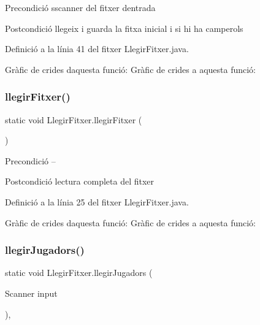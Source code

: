 \begin{DoxyPrecond}{Precondició}
sscanner del fitxer d\textquotesingle{}entrada 
\end{DoxyPrecond}
\begin{DoxyPostcond}{Postcondició}
llegeix i guarda la fitxa inicial i si hi ha camperols 
\end{DoxyPostcond}


Definició a la línia 41 del fitxer Llegir\+Fitxer.\+java.

Gràfic de crides d\textquotesingle{}aquesta funció\+:
Gràfic de crides a aquesta funció\+:
\mbox{\label{class_llegir_fitxer_a821a8ff7021fb5faac6ff4297bb00b61}} 
\subsubsection{\texorpdfstring{llegir\+Fitxer()}{llegirFitxer()}}
{\footnotesize\ttfamily static void Llegir\+Fitxer.\+llegir\+Fitxer (\begin{DoxyParamCaption}{ }\end{DoxyParamCaption})\hspace{0.3cm}{\ttfamily [static]}}

\begin{DoxyPrecond}{Precondició}
-- 
\end{DoxyPrecond}
\begin{DoxyPostcond}{Postcondició}
lectura completa del fitxer 
\end{DoxyPostcond}


Definició a la línia 25 del fitxer Llegir\+Fitxer.\+java.

Gràfic de crides d\textquotesingle{}aquesta funció\+:
Gràfic de crides a aquesta funció\+:
\mbox{\label{class_llegir_fitxer_addb0fed99c782e84a9b670f89c3eecd2}} 
\subsubsection{\texorpdfstring{llegir\+Jugadors()}{llegirJugadors()}}
{\footnotesize\ttfamily static void Llegir\+Fitxer.\+llegir\+Jugadors (\begin{DoxyParamCaption}\item[{Scanner}]{input }\end{DoxyParamCaption})\hspace{0.3cm}{\ttfamily [static]}, {\ttfamily [private]}}

